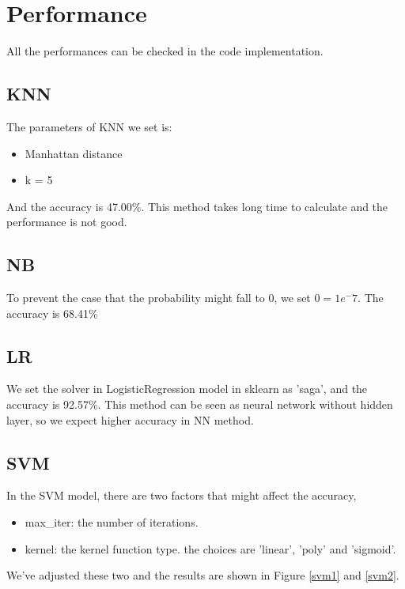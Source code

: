 \documentclass{article}
\begin{document}
	 \section{Performance}
	 
	 All the performances can be checked in the code implementation.
	 
	 \subsection{KNN}
	 
	 The parameters of KNN we set is: 
	 \begin{itemize}
	 	\item Manhattan distance
	 	\item k = 5
	 \end{itemize} 
 	And the accuracy is 47.00\%. This method takes long time to calculate and the performance is not good.
 	
 	\subsection{NB}
 	
 	To prevent the case that the probability might fall to 0, we set $0 = 1e^-7$. The accuracy is 68.41\%
 	
 	\subsection{LR}
 	
 	We set the solver in LogisticRegression model in sklearn as 'saga', and the accuracy is 92.57\%. This method can be seen as neural network without hidden layer, so we expect higher accuracy in NN method.
 	
 	\subsection{SVM}
 	
 	In the SVM model, there are two factors that might affect the accuracy,
 	\begin{itemize}
 		\item max\_iter: the number of iterations.
 		\item kernel: the kernel function type. the choices are 'linear', 'poly' and 'sigmoid'.
 	\end{itemize}
 	We've adjusted these two and the results are shown in Figure \ref{svm1} and \ref{svm2}.
 	
\end{document}
